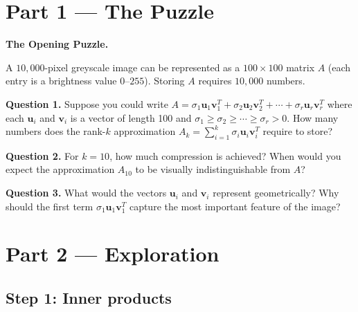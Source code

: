 \documentclass[12pt,a4paper]{article}
\begin{document}
\newpage

\section{Part 1 \texorpdfstring{---}{--} The Puzzle}

\begin{puzzlebox}
\textbf{The Opening Puzzle.}

A $10{,}000$-pixel greyscale image can be represented as a $100\times 100$ matrix $A$ (each entry is a brightness value $0$--$255$). Storing $A$ requires $10{,}000$ numbers.

\medskip
\textbf{Question 1.} Suppose you could write $A = \sigma_1\mathbf{u}_1\mathbf{v}_1^T + \sigma_2\mathbf{u}_2\mathbf{v}_2^T + \cdots + \sigma_r\mathbf{u}_r\mathbf{v}_r^T$ where each $\mathbf{u}_i$ and $\mathbf{v}_i$ is a vector of length 100 and $\sigma_1 \geq \sigma_2 \geq \cdots \geq \sigma_r > 0$. How many numbers does the rank-$k$ approximation $A_k = \sum_{i=1}^k \sigma_i\mathbf{u}_i\mathbf{v}_i^T$ require to store?

\textbf{Question 2.} For $k = 10$, how much compression is achieved? When would you expect the approximation $A_{10}$ to be visually indistinguishable from $A$?

\textbf{Question 3.} What would the vectors $\mathbf{u}_i$ and $\mathbf{v}_i$ represent geometrically? Why should the first term $\sigma_1\mathbf{u}_1\mathbf{v}_1^T$ capture the most important feature of the image?
\end{puzzlebox}

\section{Part 2 \texorpdfstring{---}{--} Exploration}

\subsection{Step 1: Inner products}
\end{document}
